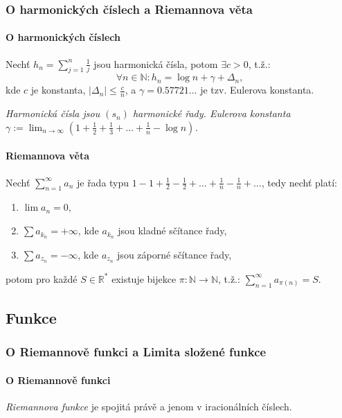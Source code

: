 \documentclass[10pt,a4paper]{article}
\newcommand{\N}{{\mathbb{N}}}
\newcommand{\R}{{\mathbb{R}}}
\begin{document}
\subsubsection{O harmonických číslech a Riemannova věta}

\paragraph*{O harmonických číslech} Nechť $h_n = \displaystyle \sum_{j=1}^{n} \frac 1j$ jsou harmonická čísla, potom $\exists c>0$, t.ž.:
\[
    \forall n\in \N: h_n = \log n + \gamma + \Delta_n,
\] kde $c$ je konstanta, $|\Delta_n| \leq \frac cn$, a $\gamma = 0.57721\dots$ je tzv. Eulerova konstanta.

\textit{Harmonická čísla jsou $(s_n)$ harmonické řady. Eulerova konstanta $\displaystyle \gamma := \lim_{n\to \infty}(1+\frac 12 + \frac 13 + \dots + \frac 1n - \log n)$.}

\paragraph*{Riemannova věta} Nechť $\displaystyle \sum_{n=1}^{\infty} a_n$ je řada typu $1 - 1 + \frac 12 - \frac 12 + \dots + \frac 1n - \frac 1n + \dots$, tedy nechť platí:
\begin{enumerate}
    \item $\lim a_n = 0$,
    \item $\sum a_{k_n} = +\infty$, kde $a_{k_n}$ jsou kladné sčítance řady,
    \item $\sum a_{z_n} = -\infty$, kde $a_{z_n}$ jsou záporné sčítance řady,
\end{enumerate} 
potom pro každé $S\in \R^*$ existuje bijekce $\pi: \N \to \N$, t.ž.: $\displaystyle \sum_{n=1}^{\infty} a_{\pi(n)} = S$.

\subsection{Funkce}
\subsubsection{O Riemannově funkci a Limita složené funkce}

\paragraph*{O Riemannově funkci} \textit{Riemannova funkce} je spojitá právě a jenom v iracionálních číslech.
\end{document}
